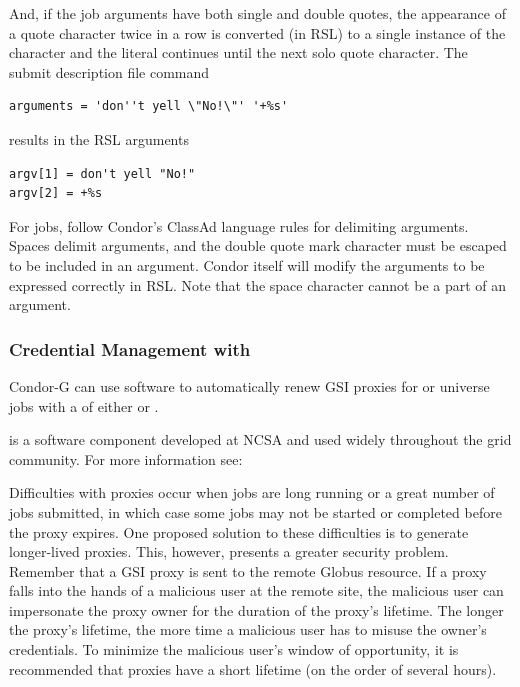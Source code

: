 And, if the job arguments have both single and double quotes,
the appearance of a quote character twice in a
row is converted (in RSL) to a single instance of the character and the literal
continues until the next solo quote character.
The submit description file command 
\footnotesize
\begin{verbatim}
arguments = 'don''t yell \"No!\"' '+%s'
\end{verbatim}
\normalsize
results in the RSL arguments
\begin{verbatim}
argv[1] = don't yell "No!"
argv[2] = +%s
\end{verbatim}

For   jobs,
follow Condor's ClassAd language rules for delimiting arguments.
Spaces delimit arguments,
and the double quote mark character must be escaped to be included
in an argument.
Condor itself will modify the arguments to be expressed correctly
in RSL.
Note that the space character cannot be a part of an argument.

\subsubsection{\label{sec:My-Proxy}Credential Management with }
Condor-G can use 
software to automatically renew GSI proxies for
 or
universe jobs with a
 of either
or
.

 is a software component developed at
NCSA and used widely throughout the grid community.
For more information see:

Difficulties with proxies occur
when jobs are long running or a
great number of jobs submitted,
in which case some jobs may not be started
or completed before the proxy expires.
One proposed solution to these difficulties is to generate
longer-lived proxies.
This, however, presents a greater security problem.
Remember that a GSI proxy is sent to the remote Globus resource.
If a proxy falls into the hands of a malicious user at the remote site,
the malicious user can impersonate the proxy owner
for the duration of the proxy's lifetime.
The longer the proxy's lifetime,
the more time a malicious user has to misuse the owner's credentials.
To minimize the malicious user's window of opportunity,
it is recommended that proxies have a short lifetime
(on the order of several hours).

